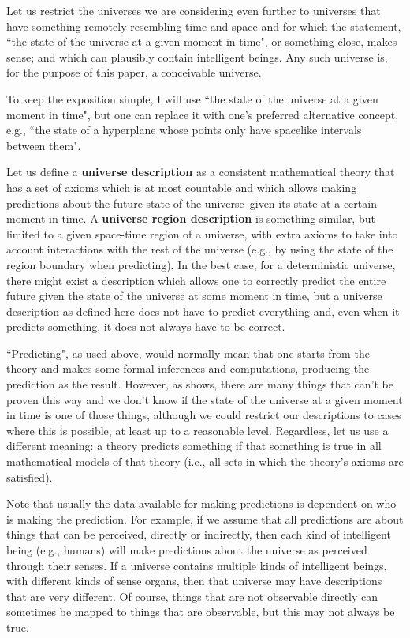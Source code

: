 \documentclass[a4paper
,draft
]{article}
\newcommand{\definitie}[1]{\textbf{#1}}
\newcommand{\ghilimele}[1]{``#1"}
\begin{document}
Let us restrict the universes we are considering even further to universes that
have something remotely resembling time and space and for which
the statement, \ghilimele{the state of the universe at a given moment in time}, or something
close, makes sense; and which can plausibly contain intelligent beings.
Any such universe is, for the purpose of this paper, a conceivable universe.

To keep the exposition simple, I will use
\ghilimele{the state of the universe at a given moment in time},
but one can replace it with one's preferred alternative concept, e.g.,
\ghilimele{the state of a hyperplane whose points only have spacelike
intervals between them}.

Let us define a \definitie{universe description} as a
consistent mathematical theory that has
a set of axioms which is at most countable and which allows making
predictions about the future state of the universe–given its state
at a certain moment in time. A \definitie{universe region description}
is something similar, but limited to a given space-time region of a universe,
with extra axioms to take into account interactions with the rest of the
universe (e.g., by using the state of the region boundary when predicting).
In the best case, for a deterministic universe, there might exist
a description which allows one to correctly predict the entire future
given the state of the universe at some moment in time,
but a universe description
as defined here does not have to predict everything and,
even when it predicts something, it does not always have to be correct.

\ghilimele{Predicting}, as used above, would normally mean that one
starts from the theory and makes some formal inferences and computations, producing
the prediction as the result.
However, as \cite{Calude2013} shows, there are many
things that can't be proven this way and
we don't know if the state of the universe at a given moment in time is one of
those things, although we could restrict our descriptions to cases where this
is possible, at least up to a reasonable level.
Regardless, let us use a different meaning: a theory predicts something if
that something is true in all mathematical models of that theory (i.e., all
sets in which the theory's axioms are satisfied).

Note that usually the data available for making predictions is dependent
on who is making the prediction. For example, if we assume that
all predictions are about things that can be perceived, directly or indirectly,
then
each kind of intelligent being (e.g., humans) will make predictions
about the universe as perceived through their senses. If a universe contains
multiple kinds of intelligent beings, with different kinds of
sense organs, then that universe may have descriptions that are
very different.
Of course, things that are not observable directly can sometimes be mapped
to things that are observable, but this may not always be true.
\end{document}
